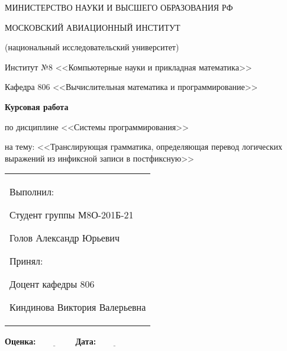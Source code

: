 	\begin{titlepage}
	\thispagestyle{specialfooter}
	
	\begin{center}
		МИНИСТЕРСТВО НАУКИ И ВЫСШЕГО ОБРАЗОВАНИЯ РФ
		
		\vspace{1cm}
		
		МОСКОВСКИЙ АВИАЦИОННЫЙ ИНСТИТУТ
		\par
		(национальный исследовательский университет)
		
		\vspace{1cm}
		
		Институт №8 <<Компьютерные науки и прикладная математика>>
		
		\par
		\vspace{1cm}
		
		Кафедра 806 <<Вычислительная математика и программирование>>
		
		\vfill
		
		{\Large \textbf{Курсовая работа}}
		\vspace{0.5cm}
		\par
		по дисциплине <<Системы программирования>>
		\par
		на тему: <<Транслирующая грамматика, определяющая перевод логических выражений из инфиксной записи в постфиксную>>
		
		\end{center}
		
		\vfill
		
		\begin{minipage}{0.45\textwidth}

		\end{minipage}%
		\hfill
		\begin{minipage}{0.5\textwidth}
			\begin{tabular}{p{\textwidth}}
				\raggedright 
				Выполнил:
				\par
				Студент группы М8О-201Б-21
				\par
				Голов Александр Юрьевич
				\par
				\vspace{0.5cm}
				Принял:
				\par
				Доцент кафедры 806
				\par
				Киндинова Виктория Валерьевна
			\end{tabular}
		\end{minipage}
		
		\vspace{2cm}
		
		\textbf{Оценка:$\underline{\; \; \; \; \; \; \; \; \; \; \; \; \; \; \; \;}$} \hfill \textbf{Дата:$\underline{\; \; \; \; \; \; \; \; \; \; \; \; \; \; \; \;}$}
		
		
\end{titlepage}